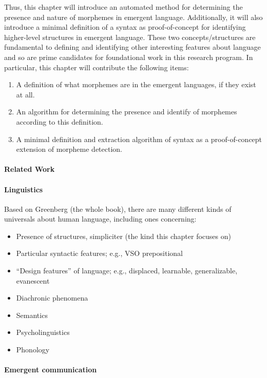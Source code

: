Thus, this chapter will introduce an automated method for determining the presence and nature of morphemes in emergent language.
Additionally, it will also introduce a minimal definition of a syntax as proof-of-concept for identifying higher-level structures in emergent language.
These two concepts/structures are fundamental to defining and identifying other interesting features about language and so are prime candidates for foundational work in this research program.
In particular, this chapter will contribute the following items:
\begin{enumerate}[nosep]
  \item A definition of what morphemes are in the emergent languages, if they exist at all.
  \item An algorithm for determining the presence and identify of morphemes according to this definition.
  \item A minimal definition and extraction algorithm of syntax as a proof-of-concept extension of morpheme detection.
\end{enumerate}


\paragraph{Related Work}


\paragraph{Linguistics}

Based on Greenberg (the whole book), there are many different kinds of universals about human language, including ones concerning:
\begin{itemize}[nosep]
  \item Presence of structures, simpliciter (the kind this chapter focuses on)
  \item Particular syntactic features; e.g., VSO \textrightarrow{} prepositional
  \item ``Design features'' of language; e.g., displaced, learnable, generalizable, evanescent
  \item Diachronic phenomena
  \item Semantics
  \item Psycholinguistics
  \item Phonology
\end{itemize}



\paragraph{Emergent communication}




